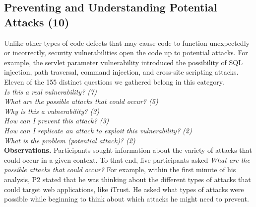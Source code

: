 \documentclass[conference]{IEEEtran}
\begin{document}








\noindent\subsection{\textbf{Preventing and Understanding Potential Attacks (10)}}\label{pupa}
Unlike other types of code defects that may cause code to function unexpectedly or incorrectly, security vulnerabilities open the code up to potential attacks. For example, the servlet parameter vulnerability introduced the possibility of SQL injection, path traversal, command injection, and cross-site scripting attacks.
Eleven of the 155 distinct questions we gathered belong in this category.
\\

\noindent\emph{Is this a real vulnerability? (7)} \\
\emph{What are the possible attacks that could occur? (5)} \\
\emph{Why is this a vulnerability? (3)} \\
\emph{How can I prevent this attack? (3)} \\
\emph{How can I replicate an attack to exploit this vulnerability? (2)} \\
\emph{What is the problem (potential attack)? (2)} \\

\noindent\textbf{Observations.}
Participants sought information about the variety of attacks that could occur in a given context.
To that end, five participants asked \textit{What are the possible attacks that could occur?}
For example, within the first minute of his analysis, P2 stated that he was thinking about the different types of attacks that could target web applications, like iTrust. He asked what types of attacks were possible while beginning to think about which attacks he might need to prevent.
\end{document}
